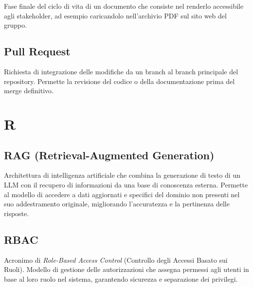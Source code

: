 \documentclass[a4paper, 11pt, oneside]{scrartcl} %
\begin{document}

Fase finale del ciclo di vita di un documento che consiste nel renderlo accessibile agli stakeholder, ad esempio caricandolo nell'archivio PDF sul sito web del gruppo.

\vspace{0.5cm}

\subsection*{Pull Request}


Richiesta di integrazione delle modifiche da un branch al branch principale del repository. Permette la revisione del codice o della documentazione prima del merge definitivo.

\vspace{0.5cm}


\section*{R}


\subsection*{RAG (Retrieval-Augmented Generation)}
Architettura di intelligenza artificiale che combina la generazione di testo di un LLM con il recupero di informazioni da una base di conoscenza esterna. Permette al modello di accedere a dati aggiornati e specifici del dominio non presenti nel suo addestramento originale, migliorando l'accuratezza e la pertinenza delle risposte.
\vspace{0.5cm}


\subsection*{RBAC}


Acronimo di \textit{Role-Based Access Control} (Controllo degli Accessi Basato sui Ruoli). Modello di gestione delle autorizzazioni che assegna permessi agli utenti in base al loro ruolo nel sistema, garantendo sicurezza e separazione dei privilegi.
\end{document}
